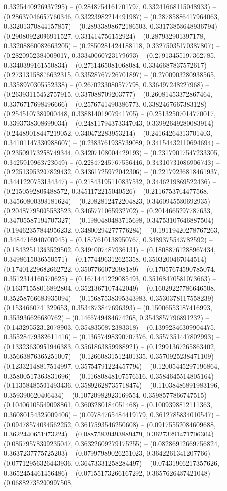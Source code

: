 0.3325440926937295) -- (0.2848754161701797, 0.33241668115048933) -- (0.28637046657760346, 0.33223982214491987) -- (0.28785886417964063, 0.33201370844157857) -- (0.28933898672186503, 0.33173858648936794) -- (0.29080922096911527, 0.331414756152924) -- (0.287932901397178, 0.33208860082663205) -- (0.2850281424188118, 0.33275035170387807) -- (0.2820952384009017, 0.33340060723179693) -- (0.27913455197362785, 0.3340399161550834) -- (0.2761465081068084, 0.3346687837572617) -- (0.27313158876632315, 0.33528767726701897) -- (0.2700903280938565, 0.3358970305552338) -- (0.2670233080577798, 0.336497248227968) -- (0.26393115452757915, 0.337088709203777) -- (0.26081453372867464, 0.3376717698496666) -- (0.2576741490386773, 0.3382467667383128) -- (0.2545107380900448, 0.33881401907941705) -- (0.25132507014770017, 0.3393738308699034) -- (0.24811794373347043, 0.33992649280083914) -- (0.24489018447219052, 0.340472283953214) -- (0.24164264313701403, 0.34101147330988607) -- (0.2383761938739089, 0.34154432110694694) -- (0.23509173258749344, 0.34207108004429193) -- (0.23179017547233305, 0.3425919963723049) -- (0.22847245767556446, 0.34310731086906743) -- (0.22513953207829432, 0.34361725972042306) -- (0.22179236818461937, 0.3441220753134347) -- (0.21843195110837532, 0.3446219869522436) -- (0.2150592806488572, 0.3451172215040526) -- (0.2116753704477568, 0.34560800398181624) -- (0.2082812472204823, 0.3460945580692935) -- (0.20487795005583523, 0.3465771065932702) -- (0.2014665297787633, 0.34705587194707327) -- (0.1980480483715698, 0.34753107646887504) -- (0.19462357844956232, 0.34800294277776284) -- (0.19119420278767263, 0.3484716940700945) -- (0.1877610138950767, 0.3489375543782592) -- (0.18432511363529502, 0.3494007487936131) -- (0.18088761288967434, 0.3498615036550571) -- (0.1774496312625358, 0.3503200467044514) -- (0.17401229682662722, 0.3507766072098189) -- (0.17057674590785074, 0.3512314160570625) -- (0.1671441229085493, 0.35168470581073663) -- (0.16371558016892804, 0.3521367107442049) -- (0.16029227786646508, 0.35258766683935094) -- (0.15687538395343983, 0.3530378117558239) -- (0.1534660741329653, 0.3534873847696393) -- (0.15006553187416993, 0.353936626680762) -- (0.1466749484674268, 0.3543857796891232) -- (0.14329552312078903, 0.3548350872383318) -- (0.13992846309904475, 0.35528479382611416) -- (0.13657498390707376, 0.3557351447802993) -- (0.13323630951946383, 0.3561863859988921) -- (0.12991367265863402, 0.35663876365251007) -- (0.12660831512401335, 0.3570925238471109) -- (0.12332148817514997, 0.35754791224457794) -- (0.12005445297196864, 0.35800517363831696) -- (0.11680848107576616, 0.3584645514805164) -- (0.11358485501493436, 0.35892628735718474) -- (0.11038486891983196, 0.359390620406434) -- (0.10720982923169554, 0.3598577866747515) -- (0.10406105549098861, 0.3603280184051468) -- (0.1009398812111363, 0.36080154325009406) -- (0.09784765484419179, 0.3612785834010547) -- (0.09478574084562252, 0.3617593546250608) -- (0.09175552084609688, 0.3622440651973224) -- (0.08875839493889479, 0.36273291471706304) -- (0.08579578309235047, 0.36322609279175255) -- (0.08286912669756824, 0.3637237775725203) -- (0.07997989026251023, 0.3642261341207766) -- (0.07712956326443936, 0.36473331258284497) -- (0.07431966217357626, 0.3652454461456486) -- (0.07155173266167292, 0.3657626487421048) -- (0.06882735200997508, 